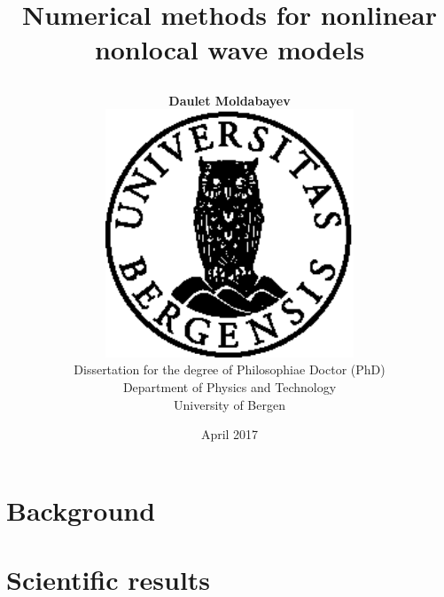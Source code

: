 \documentclass[10pt]{book}
\title{
{\fontsize{28}{30}\usefont{OT1}{phv}{bc}{n}\selectfont Numerical methods for nonlinear nonlocal wave models}
	\author{
	\textbf{Daulet Moldabayev}\vspace{3cm}\\
		\includegraphics[width=74mm]{figurer/uglo}\vspace{1em}\\
		Dissertation for the degree of Philosophiae Doctor (PhD)\vspace{3.5em}\\
		Department of Physics and Technology \\
		University of Bergen
	}
	\date{April 2017}
}
\begin{document}

\ifDownscaledFinalDoc
	\fontsize{\TextSize}{\BaseLineSkip}
	\selectfont
\fi

\ifDraft
	\doublespacing
\fi


\maketitle
\frontmatter
%


%
\tableofcontents

\mainmatter

%
%
\part{Background}

\part{Scientific results}

%
%


\backmatter

%
%

%
%
%

%
%



\end{document}
